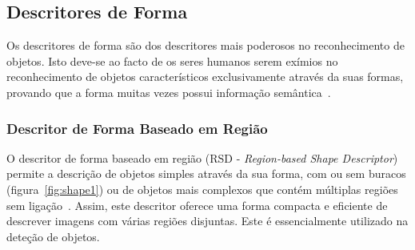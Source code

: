 %

\subsection{Descritores de Forma}

Os descritores de forma são dos descritores mais poderosos no reconhecimento de objetos. Isto deve-se ao facto de os seres humanos serem exímios no reconhecimento de objetos característicos exclusivamente através da suas formas, provando que a forma muitas vezes possui informação semântica~\cite{Bober2001}.  

\subsubsection{Descritor de Forma Baseado em Região}

O descritor de forma baseado em região (RSD - \textit{Region-based Shape Descriptor}) permite a descrição de objetos simples através da sua forma, com ou sem buracos (figura~\ref{fig:shape1}) ou de objetos mais complexos que contém múltiplas regiões sem ligação~\cite{Bober2001}. Assim, este descritor oferece uma forma compacta e eficiente de descrever imagens com várias regiões disjuntas. Este é essencialmente utilizado na deteção de objetos.

